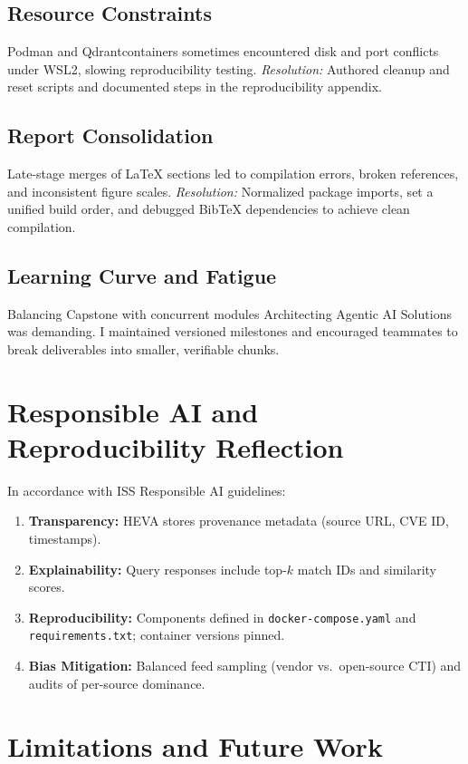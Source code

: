 \documentclass[12pt,a4paper]{article}
\begin{document}
\subsection{Resource Constraints}
Podman and Qdrantcontainers sometimes encountered disk and port conflicts under WSL2, slowing reproducibility testing. \textit{Resolution:} Authored cleanup and reset scripts and documented steps in the reproducibility appendix.

\subsection{Report Consolidation}
Late-stage merges of \LaTeX{} sections led to compilation errors, broken references, and inconsistent figure scales. \textit{Resolution:} Normalized package imports, set a unified build order, and debugged Bib\TeX{} dependencies to achieve clean compilation.

\subsection{Learning Curve and Fatigue}
Balancing Capstone with concurrent modules Architecting Agentic AI Solutions was demanding. I maintained versioned milestones and encouraged teammates to break deliverables into smaller, verifiable chunks.

\section{Responsible AI and Reproducibility Reflection}
\label{sec:rai}
In accordance with ISS Responsible AI guidelines:
\begin{enumerate}[noitemsep]
    \item \textbf{Transparency:} HEVA stores provenance metadata (source URL, CVE ID, timestamps).
    \item \textbf{Explainability:} Query responses include top-$k$ match IDs and similarity scores.
    \item \textbf{Reproducibility:} Components defined in \texttt{docker-compose.yaml} and \texttt{requirements.txt}; container versions pinned.
    \item \textbf{Bias Mitigation:} Balanced feed sampling (vendor vs.\ open-source CTI) and audits of per-source dominance.
\end{enumerate}

\section{Limitations and Future Work}
\label{sec:future}
\end{document}
